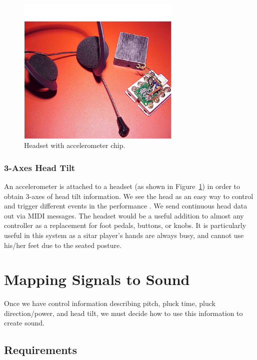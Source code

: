 \begin{figure}[t]
\centering
\includegraphics[width=78mm]{img-3-eps-converted-to-crop.pdf}      
\caption{Headset with accelerometer chip.}
\label{Kapur:img-3}       %
\end{figure}


\subsubsection{3-Axes Head Tilt}

An accelerometer is attached to a headset (as shown in Figure~\ref{Kapur:img-3})  in order to
obtain 3-axes of head tilt information. We see the head as an easy way to control
and trigger different events in the performance \cite{Merrill:2003}. We send continuous head data
out via MIDI messages. The headset would be a useful addition to almost any
controller as a replacement for foot pedals, buttons, or knobs. It is
particularly useful in this system as a sitar player's hands are always busy, and
cannot use his/her feet due to the seated posture.

\section{Mapping Signals to Sound}

Once we have control information describing pitch, pluck time, pluck
direction/power, and head tilt, we must decide how to use this information to
create sound.

\subsection{Requirements}

